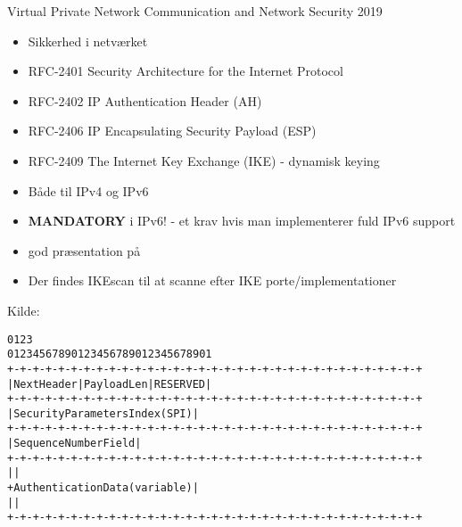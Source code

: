 \documentclass[Screen16to9,17pt,footrule]{foils}
\begin{document}
\mytitlepage
{Virtual Private Network}
{Communication and Network Security 2019}


\begin{itemize}
\item Sikkerhed i netværket
\item RFC-2401 Security Architecture for the Internet Protocol
\item RFC-2402 IP Authentication Header (AH)
\item RFC-2406 IP Encapsulating Security Payload (ESP)
\item RFC-2409 The Internet Key Exchange (IKE) - dynamisk keying
\item Både til IPv4 og IPv6
\item {\bfseries MANDATORY} i IPv6! - et krav hvis man implementerer
  fuld IPv6 support
\item god præsentation på 
\item Der findes IKEscan til at scanne efter IKE
  porte/implementationer\\
\end{itemize}


\centerline{Kilde: }



\begin{alltt}
\small
    0                   1                   2                   3
    0 1 2 3 4 5 6 7 8 9 0 1 2 3 4 5 6 7 8 9 0 1 2 3 4 5 6 7 8 9 0 1
   +-+-+-+-+-+-+-+-+-+-+-+-+-+-+-+-+-+-+-+-+-+-+-+-+-+-+-+-+-+-+-+-+
   | Next Header   |  Payload Len  |          RESERVED             |
   +-+-+-+-+-+-+-+-+-+-+-+-+-+-+-+-+-+-+-+-+-+-+-+-+-+-+-+-+-+-+-+-+
   |                 Security Parameters Index (SPI)               |
   +-+-+-+-+-+-+-+-+-+-+-+-+-+-+-+-+-+-+-+-+-+-+-+-+-+-+-+-+-+-+-+-+
   |                    Sequence Number Field                      |
   +-+-+-+-+-+-+-+-+-+-+-+-+-+-+-+-+-+-+-+-+-+-+-+-+-+-+-+-+-+-+-+-+
   |                                                               |
   +                Authentication Data (variable)                 |
   |                                                               |
   +-+-+-+-+-+-+-+-+-+-+-+-+-+-+-+-+-+-+-+-+-+-+-+-+-+-+-+-+-+-+-+-+
\end{alltt}
\end{document}
